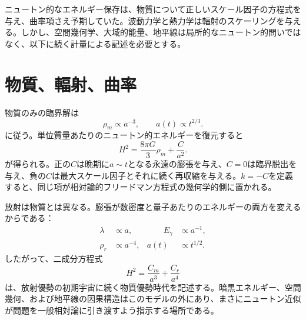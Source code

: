 ニュートン的なエネルギー保存は、物質について正しいスケール因子の方程式を与え、曲率項さえ予期していた。波動力学と熱力学は輻射のスケーリングを与える。しかし、空間幾何学、大域的能量、地平線は局所的なニュートン的問いではなく、以下に続く計量による記述を必要とする。

\section{物質、輻射、曲率}

物質のみの臨界解は
\begin{equation}
\rho_m\propto a^{-3},
\qquad
a(t)\propto t^{2/3}.
\end{equation}
に従う。単位質量あたりのニュートン的エネルギーを復元すると
\begin{equation}
H^2=\frac{8\pi G}{3}\rho_m+\frac{C}{a^2}.
\end{equation}
が得られる。正の\(C\)は晩期に\(a\sim t\)となる永遠の膨張を与え、\(C=0\)は臨界脱出を与え、負の\(C\)は最大スケール因子とそれに続く再収縮を与える。\(k=-C\)を定義すると、同じ項が相対論的フリードマン方程式の幾何学的側に置かれる。

放射は物質とは異なる。膨張が数密度と量子あたりのエネルギーの両方を変えるからである：
\begin{equation}
\begin{aligned}
\lambda&\propto a,
&\qquad E_\gamma&\propto a^{-1},\\
\rho_r&\propto a^{-4},
& a(t)&\propto t^{1/2}.
\end{aligned}
\end{equation}
したがって、二成分方程式
\begin{equation}
H^2=\frac{C_m}{a^3}+\frac{C_r}{a^4}
\end{equation}
は、放射優勢の初期宇宙に続く物質優勢時代を記述する。暗黒エネルギー、空間幾何、および地平線の因果構造はこのモデルの外にあり、まさにニュートン近似が問題を一般相対論に引き渡すよう指示する場所である。
